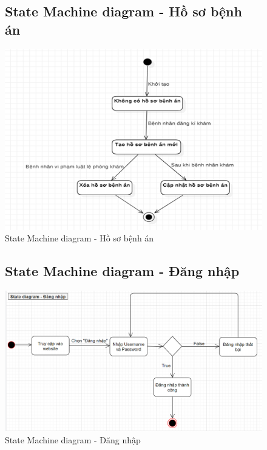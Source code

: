 \documentclass{report}
\begin{document}
\begin{center}
	\begin{figure}[!htp]
		\subsection{State Machine diagram - Hồ sơ bệnh án}
		\begin{center}
			\includegraphics[scale=.9]{Hinh/State Machine diagram Hồ sơ bệnh án.png}
		\end{center}
		\caption{State Machine diagram - Hồ sơ bệnh án}
	\end{figure}
\end{center}


\begin{center}
	\begin{figure}[!htp]
		\subsection{State Machine diagram - Đăng nhập}
		\begin{center}
			\includegraphics[scale=.5]{Hinh/State Machine diagram Đăng nhập.png}
		\end{center}
		\caption{State Machine diagram - Đăng nhập}
	\end{figure}
\end{center}
\end{document}
